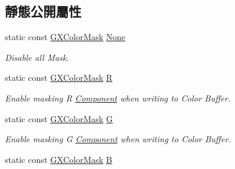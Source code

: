 \subsection*{靜態公開屬性}
\begin{DoxyCompactItemize}
\item 
static const \hyperlink{class_magnum_1_1_g_x_color_mask}{G\+X\+Color\+Mask} \hyperlink{class_magnum_1_1_g_x_color_mask_a59f1a189bd225c853c157154817799d9}{None}\hypertarget{class_magnum_1_1_g_x_color_mask_a59f1a189bd225c853c157154817799d9}{}\label{class_magnum_1_1_g_x_color_mask_a59f1a189bd225c853c157154817799d9}

\begin{DoxyCompactList}\small\item\em Disable all Mask. \end{DoxyCompactList}\item 
static const \hyperlink{class_magnum_1_1_g_x_color_mask}{G\+X\+Color\+Mask} \hyperlink{class_magnum_1_1_g_x_color_mask_aa7deefdc14dae3c39523fd071cf53ed0}{R}\hypertarget{class_magnum_1_1_g_x_color_mask_aa7deefdc14dae3c39523fd071cf53ed0}{}\label{class_magnum_1_1_g_x_color_mask_aa7deefdc14dae3c39523fd071cf53ed0}

\begin{DoxyCompactList}\small\item\em Enable masking R \hyperlink{class_magnum_1_1_component}{Component} when writing to Color Buffer. \end{DoxyCompactList}\item 
static const \hyperlink{class_magnum_1_1_g_x_color_mask}{G\+X\+Color\+Mask} \hyperlink{class_magnum_1_1_g_x_color_mask_aad991fff0f0304115805b94ea54b2b2b}{G}\hypertarget{class_magnum_1_1_g_x_color_mask_aad991fff0f0304115805b94ea54b2b2b}{}\label{class_magnum_1_1_g_x_color_mask_aad991fff0f0304115805b94ea54b2b2b}

\begin{DoxyCompactList}\small\item\em Enable masking G \hyperlink{class_magnum_1_1_component}{Component} when writing to Color Buffer. \end{DoxyCompactList}\item 
static const \hyperlink{class_magnum_1_1_g_x_color_mask}{G\+X\+Color\+Mask} \hyperlink{class_magnum_1_1_g_x_color_mask_a1ac67b38e45348765058f90c5314b067}{B}\hypertarget{class_magnum_1_1_g_x_color_mask_a1ac67b38e45348765058f90c5314b067}{}\label{class_magnum_1_1_g_x_color_mask_a1ac67b38e45348765058f90c5314b067}


\end{DoxyCompactItemize}
